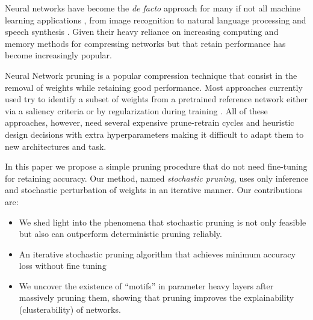 
    Neural networks have become the \textit{de facto} approach for many if not
    all machine learning applications \cite{lecunDeepLearning2015}, from  image
    recognition \cite{dengImageNetLargescaleHierarchical2009} to  natural language
    processing \cite{devlinBERTPretrainingDeep2019} and  
    speech synthesis \cite{oordWaveNetGenerativeModel2016}.
    Given their heavy reliance on increasing computing and memory
    \cite{brownLanguageModelsAre2020,thompsonComputationalLimitsDeep2020}
    methods for compressing networks but that retain performance has become
    increasingly popular.

Neural Network pruning is a popular compression technique that consist in the
removal of weights while retaining good performance.
Most approaches currently used try to identify a subset of weights from a
pretrained reference network either via a saliency criteria
\cite{mozerSkeletonizationTechniqueTrimming1988,
hassibiSecondOrderDerivatives1992,lecunOptimalBrainDamage1989} or by
regularization during training
\cite{chauvinBackPropagationAlgorithmOptimal1988,
carreira-perpinanLearningCompressionAlgorithmsNeural2018}. All of these
approaches, however, need several expensive prune-retrain cycles and heuristic
design decisions with extra hyperparameters making it difficult to adapt them
to new architectures and task.

In this paper we propose a simple pruning procedure that do not need
fine-tuning for retaining accuracy. Our method, named \textit{stochastic
pruning}, uses only inference and stochastic perturbation of weights in an
iterative manner.
Our contributions are:
     \begin{itemize}
         \item We shed light into the phenomena that stochastic pruning is not
             only feasible but also can outperform deterministic pruning
             reliably.
        \item An iterative stochastic pruning algorithm that achieves minimum
            accuracy loss without fine tuning

        \item We uncover the existence of ``motifs'' in parameter heavy
                layers after massively pruning them, showing that pruning
                improves the explainability (clusterability) of
                networks.

     \end{itemize}
     

